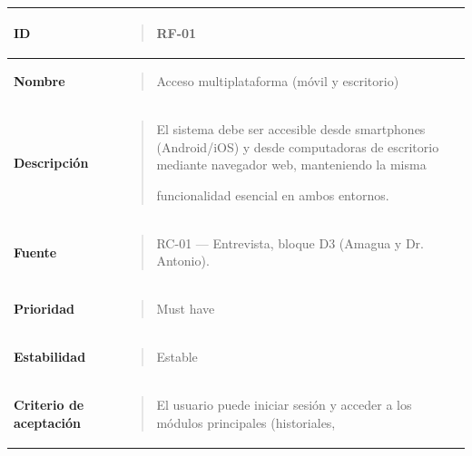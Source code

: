 \documentclass[
]{article}
\newcounter{none} %
\begin{document}
{\def\LTcaptype{none} %
\begin{longtable}[]{@{}
  >{\raggedright\arraybackslash}p{}
  >{\raggedright\arraybackslash}p{}@{}}
\toprule\noalign{}
\begin{minipage}[b]{\linewidth}\raggedright
\textbf{ID}
\end{minipage} & \begin{minipage}[b]{\linewidth}\raggedright
\begin{quote}
RF-01
\end{quote}
\end{minipage} \\
\midrule\noalign{}
\endhead
\bottomrule\noalign{}
\endlastfoot
\textbf{Nombre} & \begin{minipage}[t]{\linewidth}\raggedright
\begin{quote}
Acceso multiplataforma (móvil y escritorio)
\end{quote}
\end{minipage} \\
\textbf{Descripción} & \begin{minipage}[t]{\linewidth}\raggedright
\begin{quote}
El sistema debe ser accesible desde smartphones (Android/iOS) y desde
computadoras de escritorio mediante navegador web, manteniendo la misma

funcionalidad esencial en ambos entornos.
\end{quote}
\end{minipage} \\
\textbf{Fuente} & \begin{minipage}[t]{\linewidth}\raggedright
\begin{quote}
RC-01 --- Entrevista, bloque D3 (Amagua y Dr. Antonio).
\end{quote}
\end{minipage} \\
\textbf{Prioridad} & \begin{minipage}[t]{\linewidth}\raggedright
\begin{quote}
Must have
\end{quote}
\end{minipage} \\
\textbf{Estabilidad} & \begin{minipage}[t]{\linewidth}\raggedright
\begin{quote}
Estable
\end{quote}
\end{minipage} \\
\textbf{Criterio de aceptación} &
\begin{minipage}[t]{\linewidth}\raggedright
\begin{quote}
El usuario puede iniciar sesión y acceder a los módulos principales
(historiales,


\end{quote}
\end{minipage}
\end{longtable}}
\end{document}
